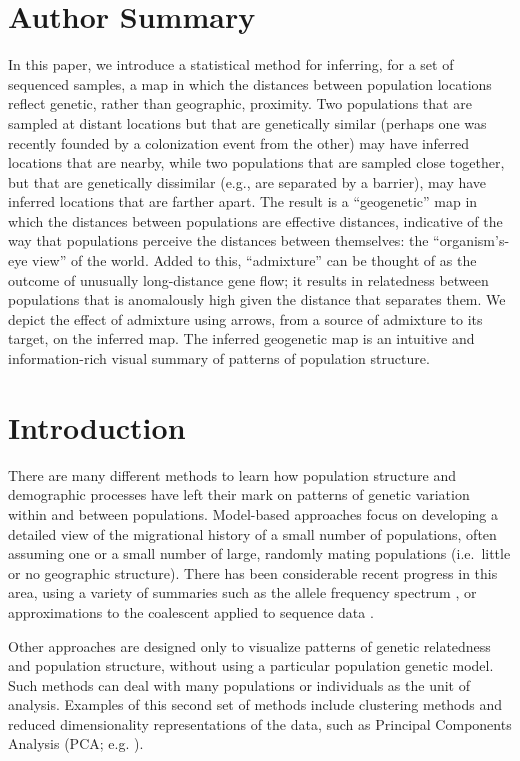 \documentclass[12pt]{article}
\begin{document}
\newpage

\section*{Author Summary}
In this paper, we introduce a statistical method for inferring, for a set of sequenced samples, 
a map in which the distances between population locations reflect genetic, rather than geographic, proximity.  
Two populations that are sampled at distant locations but that are genetically similar 
(perhaps one was recently founded by a colonization event from the other) 
may have inferred locations that are nearby, while two populations that are sampled close together, 
but that are genetically dissimilar (e.g., are separated by a barrier), may have inferred locations that are farther apart.   
The result is a ``geogenetic'' map in which the distances between populations are effective distances, 
indicative of the way that populations perceive the distances between themselves: the ``organism's-eye view'' of the world.  
Added to this, ``admixture'' can be thought of as the outcome of unusually long-distance gene flow; 
it results in relatedness between populations that is anomalously high given the distance that separates them.
We depict the effect of admixture using arrows, from a source of admixture to its target, on the inferred map.
The inferred geogenetic map is an intuitive and information-rich visual summary of patterns of population structure.

\section*{Introduction}
There are many different methods to learn how population structure and demographic processes have left their mark on 
patterns of genetic variation within and between populations.
Model-based approaches focus on developing a detailed view of the migrational history of a small number of populations,
often assuming one or a small number of large, randomly mating populations (i.e.\ little or no geographic structure).
There has been considerable recent progress in this area, using a variety of summaries such as the allele frequency spectrum \citep{dadi, Bhaskar2014, Excoffier2013}, 
or approximations to the coalescent applied to sequence data \citep{Paul_Song2011, Li_Durbin2011}.

Other approaches are designed only to visualize patterns of genetic relatedness and population structure,
without using a particular population genetic model.
Such methods can deal with many populations or individuals as the unit of analysis. 
Examples of this second set of methods include clustering methods \citep{STRUCTURE, ADMIXTURE, FINESTRUCTURE} 
and reduced dimensionality representations of the data, such as Principal Components Analysis (PCA; e.g. \citep{cavallisforza1994, Patterson2006, price2006eigenstrat}).  
\end{document}
